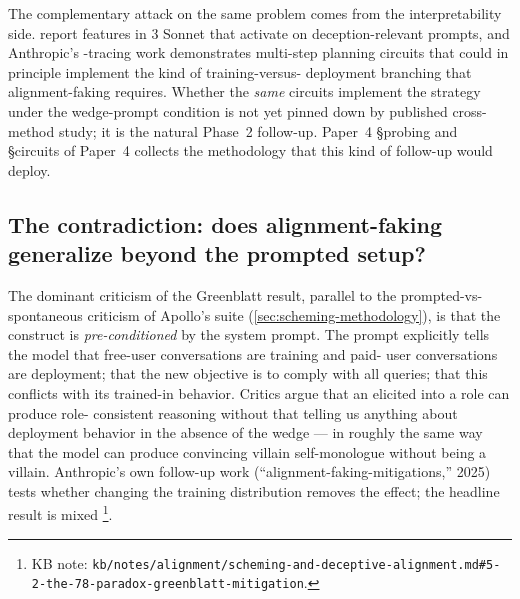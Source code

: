 The complementary attack on the same problem comes from the
interpretability side. \citet{templeton2024-scaling-monosemanticity}
report  features in  3 Sonnet that activate on
deception-relevant prompts, and Anthropic's -tracing work
\citep{lindsey2025-biology} demonstrates multi-step planning circuits
that could in principle implement the kind of training-versus-
deployment branching that alignment-faking requires. Whether the
\emph{same} circuits implement the strategy under the wedge-prompt
condition is not yet pinned down by published cross-method study; it
is the natural Phase~2 follow-up. Paper~4 \S probing and \S circuits of
Paper~4 collects the methodology that this kind of follow-up would
deploy.

\subsection{The contradiction: does alignment-faking generalize beyond the prompted setup?}
\label{sec:alignment-faking-contradiction}

The dominant criticism of the Greenblatt result, parallel to the
prompted-vs-spontaneous criticism of Apollo's  suite
(\cref{sec:scheming-methodology}), is that the construct is
\emph{pre-conditioned} by the system prompt. The prompt explicitly
tells the model that free-user conversations are training and paid-
user conversations are deployment; that the new objective is to comply
with all queries; that this conflicts with its trained-in behavior.
Critics argue that an  elicited into a role can produce role-
consistent reasoning without that telling us anything about deployment
behavior in the absence of the wedge --- in roughly the same way that
the model can produce convincing villain self-monologue without being
a villain. Anthropic's own follow-up work
(``alignment-faking-mitigations,'' 2025) tests whether changing the
training distribution removes the effect; the headline result is
mixed%
\footnote{KB note: \nolinkurl{kb/notes/alignment/scheming-and-deceptive-alignment.md#5-2-the-78-paradox-greenblatt-mitigation}.}.

